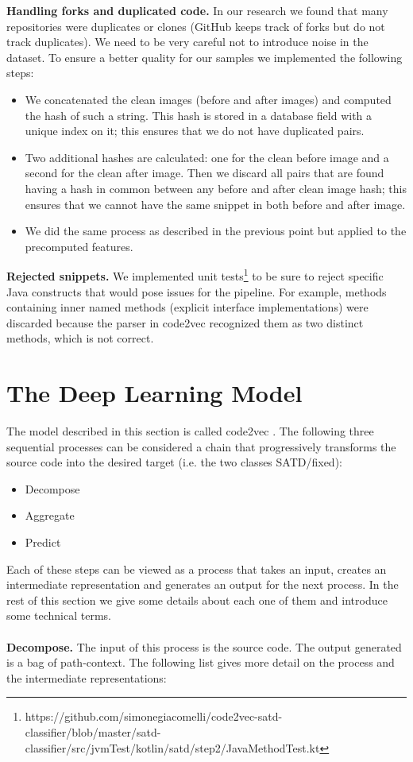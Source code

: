 \textbf{Handling forks and duplicated code.}
In our research we found that many repositories were duplicates or clones (GitHub keeps track of forks but do not track duplicates). 
We need to be very careful not to introduce noise in the dataset. To ensure a better quality for our samples we implemented the following steps:
\begin{itemize}
    \item We concatenated the clean images (before and after images) and computed the hash of such a string. This hash is stored in a database field with a unique index on it; this ensures that we do not have duplicated pairs.
    \item Two additional hashes are calculated: one for the clean before image and a second for the clean after image. Then we discard all pairs that are found having a hash in common between any before and after clean image hash; this ensures that we cannot have the same snippet in both before and after image.
    \item We did the same process as described in the previous point but applied to the precomputed features.
\end{itemize}

\textbf{Rejected snippets.} 
We implemented unit tests\footnote{https://github.com/simonegiacomelli/code2vec-satd-classifier/blob/master/satd-classifier/src/jvmTest/kotlin/satd/step2/JavaMethodTest.kt} to be sure to reject specific Java constructs that would pose issues for the pipeline. For example, methods containing inner named methods (explicit interface implementations) were discarded because the parser in code2vec recognized them as two distinct methods, which is not correct. 


\section{The Deep Learning Model}
The model described in this section is called code2vec \cite{alon2019code2vec}.
The following three sequential processes can be considered a chain that progressively transforms the source code into the desired target (i.e. the two classes SATD/fixed):
\begin{itemize}
    \item Decompose
    \item Aggregate
    \item Predict
\end{itemize}

\noindent Each of these steps can be viewed as a process that takes an input, creates an intermediate representation and generates an output for the next process.
In the rest of this section we give some details about each one of them and introduce some technical terms. 
\\
\\
\noindent \textbf{Decompose.} The input of this process is the source code. The output generated is a bag of path-context. The following list gives more detail on the process and the intermediate representations:


